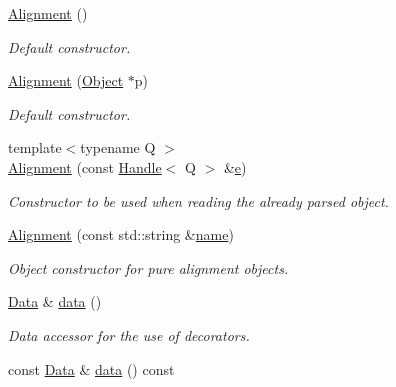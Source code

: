 \begin{DoxyCompactItemize}
\item 
\hyperlink{class_d_d4hep_1_1_alignments_1_1_alignment_a3b4f4e5289181ce34cf88d4d59d40ad3}{Alignment} ()
\begin{DoxyCompactList}\small\item\em Default constructor. \end{DoxyCompactList}\item 
\hyperlink{class_d_d4hep_1_1_alignments_1_1_alignment_afb90531c93e16959b04cfe00ede8e9a1}{Alignment} (\hyperlink{class_d_d4hep_1_1_alignments_1_1_alignment_a3ed6fd0370cb7b8015d772df7ff005fc}{Object} $\ast$p)
\begin{DoxyCompactList}\small\item\em Default constructor. \end{DoxyCompactList}\item 
{\footnotesize template$<$typename Q $>$ }\\\hyperlink{class_d_d4hep_1_1_alignments_1_1_alignment_a8f184f568b2b423780115e41ea514558}{Alignment} (const \hyperlink{class_d_d4hep_1_1_handle}{Handle}$<$ Q $>$ \&\hyperlink{_volumes_8cpp_a8a9a1f93e9b09afccaec215310e64142}{e})
\begin{DoxyCompactList}\small\item\em Constructor to be used when reading the already parsed object. \end{DoxyCompactList}\item 
\hyperlink{class_d_d4hep_1_1_alignments_1_1_alignment_afe496862cf06bb5ba006b6c20362e2b1}{Alignment} (const std\+::string \&\hyperlink{class_d_d4hep_1_1_handle_a27c7d467a609ab32c133e1f3c7d85ef5}{name})
\begin{DoxyCompactList}\small\item\em Object constructor for pure alignment objects. \end{DoxyCompactList}\item 
\hyperlink{class_d_d4hep_1_1_alignments_1_1_alignment_a5ff6a2c0b838274552fbac2f52b9a652}{Data} \& \hyperlink{class_d_d4hep_1_1_alignments_1_1_alignment_a98f34faa8c45525335ebfae7f2506e8c}{data} ()
\begin{DoxyCompactList}\small\item\em Data accessor for the use of decorators. \end{DoxyCompactList}\item 
const \hyperlink{class_d_d4hep_1_1_alignments_1_1_alignment_a5ff6a2c0b838274552fbac2f52b9a652}{Data} \& \hyperlink{class_d_d4hep_1_1_alignments_1_1_alignment_a918949c10e5dfb83cb13bc163333f391}{data} () const

\end{DoxyCompactItemize}
